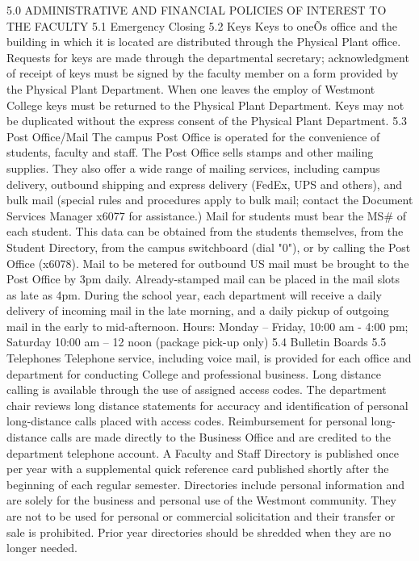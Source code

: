 \documentclass[letterpaper, 11pt]{article}
\begin{document}
	5.0 ADMINISTRATIVE AND FINANCIAL POLICIES OF INTEREST TO THE FACULTY
	5.1 Emergency Closing
	5.2 Keys
	Keys to oneÕs office and the building in which it is located are distributed through the Physical Plant office.  Requests for keys are made through the departmental secretary; acknowledgment of receipt of keys must be signed by the faculty member on a form provided by the Physical Plant Department.  When one leaves the employ of Westmont College keys must be returned to the Physical Plant Department.  Keys may not be duplicated without the express consent of the Physical Plant Department.
	5.3 Post Office/Mail
	The campus Post Office is operated for the convenience of students, faculty and staff. The Post Office sells stamps and other mailing supplies. They also offer a wide range of mailing services, including campus delivery, outbound shipping and express delivery (FedEx, UPS and others), and bulk mail (special rules and procedures apply to bulk mail; contact the Document Services Manager x6077 for assistance.)
	Mail for students must bear the MS\# of each student. This data can be obtained from the students themselves, from the Student Directory, from the campus switchboard (dial "0"), or by calling the Post Office (x6078).
	Mail to be metered for outbound US mail must be brought to the Post Office by 3pm daily. Already-stamped mail can be placed in the mail slots as late as 4pm. During the school year, each department will receive a daily delivery of incoming mail in the late morning, and a daily pickup of outgoing mail in the early to mid-afternoon.
	Hours:  Monday -- Friday, 10:00 am - 4:00 pm; Saturday 10:00 am -- 12 noon (package pick-up only)
	5.4 Bulletin Boards
	5.5 Telephones
	Telephone service, including voice mail, is provided for each office and department for conducting College and professional business.  Long distance calling is available through the use of assigned access codes.  The department chair reviews long distance statements for accuracy and identification of personal long-distance calls placed with access codes.  Reimbursement for personal long-distance calls are made directly to the Business Office and are credited to the department telephone account.  A Faculty and Staff Directory is published once per year with a supplemental quick reference card published shortly after the beginning of each regular semester.  Directories include personal information and are solely for the business and personal use of the Westmont community.  They are not to be used for personal or commercial solicitation and their transfer or sale is prohibited.  Prior year directories should be shredded when they are no longer needed.
\end{document}
